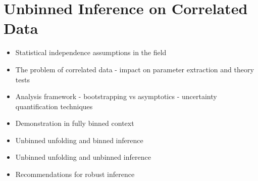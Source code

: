 \chapter{Unbinned Inference on Correlated Data}
\label{chap:unbinned_correlations}
\begin{itemize}
    \item Statistical independence assumptions in the field
    \item The problem of correlated data - impact on parameter extraction and theory tests
    \item Analysis framework - bootstrapping vs asymptotics - uncertainty quantification techniques
    \item Demonstration in fully binned context
    \item Unbinned unfolding and binned inference
    \item Unbinned unfolding and unbinned inference
    \item Recommendations for robust inference
\end{itemize}
